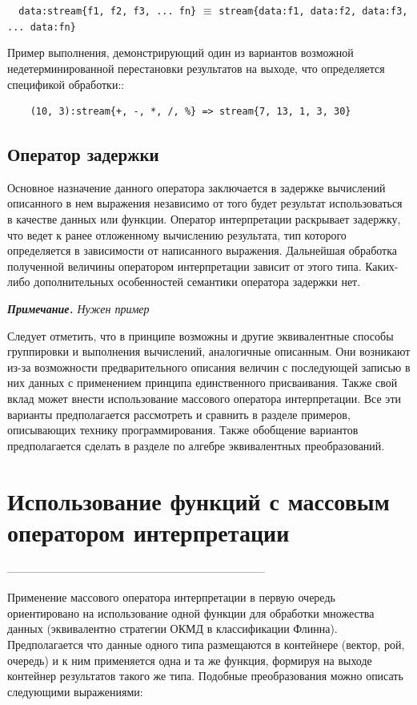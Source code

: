 \verb|  data:stream{f1, f2, f3, ... fn}| $\equiv$ \verb|stream{data:f1, data:f2, data:f3, ... data:fn}|

Пример выполнения, демонстрирующий один из вариантов возможной недетерминированной перестановки результатов на выходе, что определяется спецификой обработки::
\begin{verbatim}
    (10, 3):stream{+, -, *, /, %} => stream{7, 13, 1, 3, 30}
\end{verbatim}

\subsection{Оператор задержки}

Основное назначение данного оператора заключается в задержке вычислений описанного в нем выражения независимо от того будет результат использоваться в качестве данных или функции. Оператор интерпретации раскрывает задержку, что ведет к ранее отложенному вычислению результата, тип которого определяется в зависимости от написанного выражения. Дальнейшая обработка полученной величины оператором интерпретации зависит от этого типа. Каких-либо дополнительных особенностей семантики оператора задержки нет.

\textit{\textbf{Примечание.}
Нужен пример}

Следует отметить, что в принципе возможны и другие эквивалентные способы группировки и выполнения вычислений, аналогичные описанным. Они возникают из-за возможности предварительного описания величин с последующей записью в них данных с применением принципа единственного присваивания. Также свой вклад может внести использование массового оператора интерпретации. Все эти варианты предполагается рассмотреть и сравнить в разделе примеров, описывающих технику программирования. Также обобщение вариантов предполагается сделать в разделе по алгебре эквивалентных преобразований.

\section{Использование функций с массовым оператором интерпретации}
---------------------------------------------------------------------

Применение массового оператора интерпретации в первую очередь ориентировано на использование одной функции для обработки множества данных (эквивалентно стратегии ОКМД в классификации Флинна). Предполагается что данные одного типа размещаются в контейнере (вектор, рой, очередь) и к ним применяется одна и та же функция, формируя на выходе контейнер результатов такого же типа. Подобные преобразования можно описать следующими выражениями:
\begin{verbatim}
\end{verbatim}

